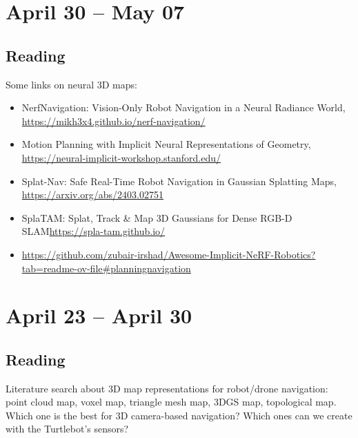 \documentclass{article}
\begin{document}
\section{April 30 -- May 07}
\subsection{Reading}
Some links on neural 3D maps:
\begin{itemize}
\item NerfNavigation: Vision-Only Robot Navigation in a Neural Radiance World, \url{https://mikh3x4.github.io/nerf-navigation/}
\item Motion Planning with Implicit Neural Representations of Geometry, \url{https://neural-implicit-workshop.stanford.edu/}
\item Splat-Nav: Safe Real-Time Robot Navigation in Gaussian Splatting Maps, \url{https://arxiv.org/abs/2403.02751}
\item SplaTAM: Splat, Track \& Map 3D Gaussians for Dense RGB-D SLAM\url{https://spla-tam.github.io/}
\item \url{https://github.com/zubair-irshad/Awesome-Implicit-NeRF-Robotics?tab=readme-ov-file#planningnavigation}
\end{itemize}
\newpage

\section{April 23 -- April 30}

\subsection{Reading}
Literature search about 3D map representations for robot/drone navigation: point cloud map, voxel map, triangle mesh map, 3DGS map, topological map. Which one is the best for 3D camera-based navigation? Which ones can we create with the Turtlebot's sensors?
\end{document}
